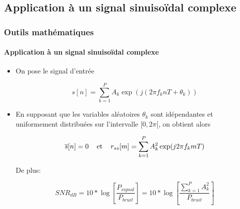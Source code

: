 \documentclass[10pt]{beamer}
\begin{document}
\subsection{Application à un signal sinuisoïdal complexe}
\begin{frame}

\frametitle{Outils mathématiques}
\framesubtitle{Application à un signal sinuisoïdal complexe}

\begin{itemize}
  
  \item On pose le signal d'entrée
  
  \begin{equation}
\label{eq:x}
s[n] = \sum_{k=1}^{P} A_k \exp(j(2\pi f_k n T + \theta _k))
\end{equation}

\item

En supposant que les variables aléatoires \(\theta _k\) sont idépendantes et uniformement distribuées sur l'intervalle \( [0, 2\pi[\), on obtient alors

\begin{equation}
\label{eq:meanx}
\overline{s}[n] = 0 \text{ \hspace{5pt} et \hspace{5pt} } r_{ss}[m] = \sum_{k=1}^{P} A_k^2 \exp(j 2\pi f_k m T)
\end{equation}

De plus:

\begin{equation}
SNR_{dB} = 10* \log \left[ \frac{P_{signal}}{P_{bruit}} \right] = 10* \log \left[ \frac{\sum_{k=1}^{P}A_k^2}{P_{bruit}} \right]
\end{equation}

\end{itemize}
\end{frame}


\end{document}

